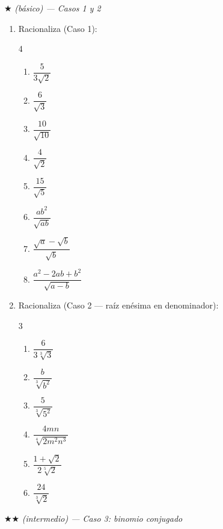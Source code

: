 \documentclass[11pt, letterpaper]{article}
\begin{document}
$\bigstar$ \textit{(básico) — Casos 1 y 2}

\begin{enumerate}[label=\textbf{\arabic*.}, leftmargin=*]
  \item Racionaliza (Caso 1):
  \begin{multicols}{4}
  \begin{enumerate}[label=\alph*)]
    \item $\dfrac{5}{3\sqrt{2}}$
    \item $\dfrac{6}{\sqrt{3}}$
    \item $\dfrac{10}{\sqrt{10}}$
    \item $\dfrac{4}{\sqrt{2}}$
    \item $\dfrac{15}{\sqrt{5}}$
    \item $\dfrac{ab^2}{\sqrt{ab}}$
    \item $\dfrac{\sqrt{a}-\sqrt{b}}{\sqrt{b}}$
    \item $\dfrac{a^2-2ab+b^2}{\sqrt{a-b}}$
  \end{enumerate}
  \end{multicols}

  \item Racionaliza (Caso 2 — raíz enésima en denominador):
  \begin{multicols}{3}
  \begin{enumerate}[label=\alph*)]
    \item $\dfrac{6}{3\sqrt[3]{3}}$
    \item $\dfrac{b}{\sqrt[3]{b^2}}$
    \item $\dfrac{5}{\sqrt[3]{5^2}}$
    \item $\dfrac{4mn}{\sqrt[4]{2m^2n^3}}$
    \item $\dfrac{1+\sqrt{2}}{2\sqrt[5]{2}}$
    \item $\dfrac{24}{\sqrt[3]{2}}$
  \end{enumerate}
  \end{multicols}
\end{enumerate}

$\bigstar\bigstar$ \textit{(intermedio) — Caso 3: binomio conjugado}
\end{document}

